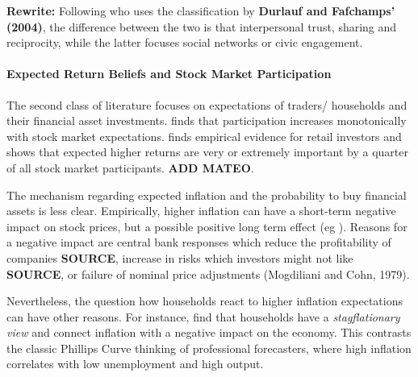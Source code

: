 \documentclass[ProjectABM]{subfiles}
\begin{document}
\textbf{Rewrite:} Following \cite{georgarakos_pasini_2011} who uses the classification by \textbf{Durlauf and Fafchamps' (2004)}, the difference between the two is that interpersonal trust, sharing and reciprocity, while the latter focuses social networks or civic engagement.


\paragraph{Expected Return Beliefs and Stock Market Participation}
The second class of literature focuses on expectations of traders/ households and their financial asset investments. \cite{arrondel_et_al_2014subjective_return_expectation} finds that participation increases monotonically with stock market expectations. \cite{giglio_et_al_2019five} finds empirical evidence for retail investors and \cite{choi_2020} shows that expected higher returns are very or extremely important by a quarter of all stock market participants. \textbf{ADD MATEO}.

The mechanism regarding expected inflation and the probability to buy financial assets is less clear. Empirically, higher inflation can have a short-term negative impact on stock prices, but a possible positive long term effect (eg \cite{anari_kolari_2001inflation}). Reasons for a negative impact are central bank responses which reduce the profitability of companies \textbf{SOURCE}, increase in risks which investors might not like \textbf{SOURCE}, or failure of nominal price adjustments (Mogdiliani and Cohn, 1979)\cite{campbell_vuolteenaho_2004inflation}.

Nevertheless, the question how households react to higher inflation expectations can have other reasons. For instance, \cite{CCG_2020_inflation_communication} find that households have a \textit{stagflationary view} and connect inflation with a negative impact on the economy. This contrasts the classic Phillips Curve thinking of professional forecasters, where high inflation correlates with low unemployment and high output. %
\end{document}
